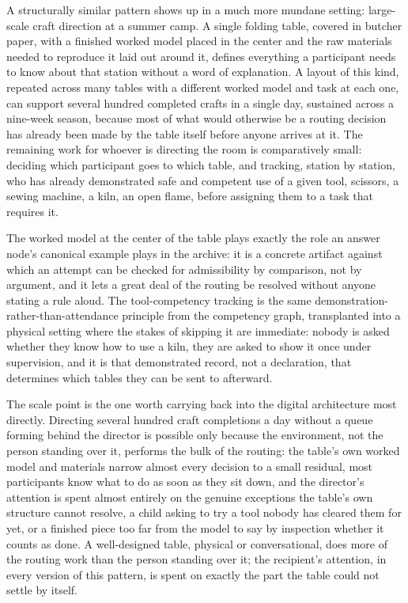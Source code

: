 \documentclass[11pt]{article}
\begin{document}
A structurally similar pattern shows up in a much more mundane setting: large-scale craft direction at a summer camp. A single folding table, covered in butcher paper, with a finished worked model placed in the center and the raw materials needed to reproduce it laid out around it, defines everything a participant needs to know about that station without a word of explanation. A layout of this kind, repeated across many tables with a different worked model and task at each one, can support several hundred completed crafts in a single day, sustained across a nine-week season, because most of what would otherwise be a routing decision has already been made by the table itself before anyone arrives at it. The remaining work for whoever is directing the room is comparatively small: deciding which participant goes to which table, and tracking, station by station, who has already demonstrated safe and competent use of a given tool, scissors, a sewing machine, a kiln, an open flame, before assigning them to a task that requires it.

The worked model at the center of the table plays exactly the role an answer node's canonical example plays in the archive: it is a concrete artifact against which an attempt can be checked for admissibility by comparison, not by argument, and it lets a great deal of the routing be resolved without anyone stating a rule aloud. The tool-competency tracking is the same demonstration-rather-than-attendance principle from the competency graph, transplanted into a physical setting where the stakes of skipping it are immediate: nobody is asked whether they know how to use a kiln, they are asked to show it once under supervision, and it is that demonstrated record, not a declaration, that determines which tables they can be sent to afterward.

The scale point is the one worth carrying back into the digital architecture most directly. Directing several hundred craft completions a day without a queue forming behind the director is possible only because the environment, not the person standing over it, performs the bulk of the routing: the table's own worked model and materials narrow almost every decision to a small residual, most participants know what to do as soon as they sit down, and the director's attention is spent almost entirely on the genuine exceptions the table's own structure cannot resolve, a child asking to try a tool nobody has cleared them for yet, or a finished piece too far from the model to say by inspection whether it counts as done. A well-designed table, physical or conversational, does more of the routing work than the person standing over it; the recipient's attention, in every version of this pattern, is spent on exactly the part the table could not settle by itself.
\end{document}
